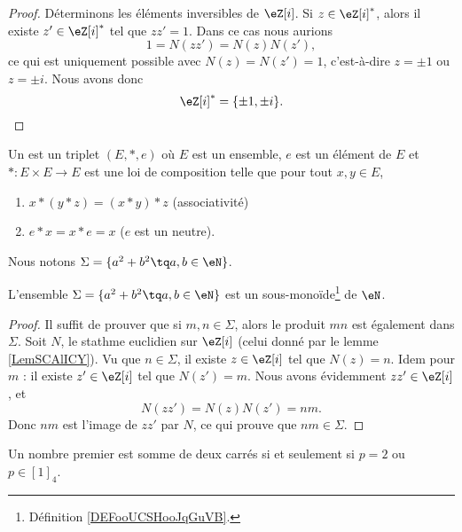 \begin{proof}

	Déterminons les éléments inversibles de \( \eZ[i]\). Si \( z\in \eZ[i]^*\), alors il existe \( z'\in \eZ[i]^*\) tel que \( zz'=1\). Dans ce cas nous aurions
	\begin{equation}
		1=N(zz')=N(z)N(z'),
	\end{equation}
	ce qui est uniquement possible avec \( N(z)=N(z')=1\), c'est-à-dire \( z=\pm 1\) ou \( z=\pm i\). Nous avons donc
	\begin{equation}
		\eZ[i]^*=\{ \pm 1,\pm i \}.
	\end{equation}
\end{proof}

\begin{definition}      \label{DEFooUCSHooJqGuVB}
	Un  est un triplet \( (E,*,e)\) où \( E\) est un ensemble, \( e\) est un élément de \( E\) et \( *\colon E\times E\to E\) est une loi de composition telle que pour tout \( x,y\in E\),
	\begin{enumerate}
		\item
		      \( x*(y*z)=(x*y)*z\) (associativité)
		\item
		      \( e*x=x*e=x\) (\( e\) est un neutre).
	\end{enumerate}
\end{definition}

Nous notons \( \Sigma=\{ a^2+b^2\tq a,b\in \eN \}\).
\begin{lemma}   \label{LemIBDPzMB}
	L'ensemble \( \Sigma=  \{ a^2+b^2\tq a,b\in \eN \}  \) est un sous-monoïde\footnote{Définition \ref{DEFooUCSHooJqGuVB}.} de \( \eN\).
\end{lemma}

\begin{proof}
	Il suffit de prouver que si \( m,n\in \Sigma\), alors le produit \( mn\) est également dans \( \Sigma\). Soit \( N\), le stathme euclidien sur \( \eZ[i]\) (celui donné par le lemme \ref{LemSCAlICY}). Vu que \( n\in \Sigma\), il existe \( z\in \eZ[i]\) tel que \( N(z)=n\). Idem pour \( m\) : il existe \( z'\in \eZ[i]\) tel que \( N(z')=m\). Nous avons évidemment \( zz'\in \eZ[i]\), et
	\begin{equation}
		N(zz')=N(z)N(z')=nm.
	\end{equation}
	Donc \( nm\) est l'image de \( zz'\) par \( N\), ce qui prouve que \( nm\in \Sigma\).
\end{proof}

\begin{theorem}   \label{ThospaAEI}
	Un nombre premier est somme de deux carrés si et seulement si \( p=2\) ou \( p\in[1]_4\).
\end{theorem}


